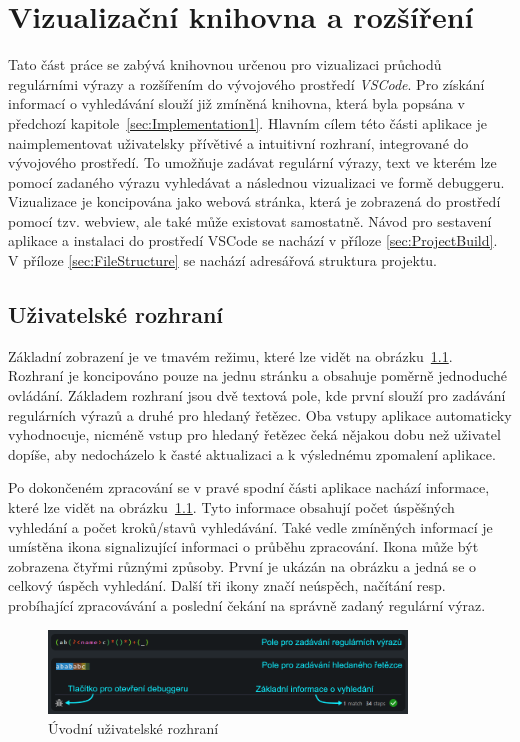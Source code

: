 \chapter{Vizualizační knihovna a rozšíření}\label{sec:Implementation2}

Tato část práce se zabývá knihovnou určenou pro vizualizaci průchodů regulárními výrazy a rozšířením do vývojového prostředí \textit{VSCode}.
Pro získání informací o vyhledávání slouží již zmíněná knihovna, která byla popsána v předchozí kapitole~\ref{sec:Implementation1}.
Hlavním cílem této části aplikace je naimplementovat uživatelsky přívětivé a intuitivní rozhraní, integrované do vývojového prostředí.
To umožňuje zadávat regulární výrazy, text ve kterém lze pomocí zadaného výrazu vyhledávat a následnou vizualizaci ve formě debuggeru.
Vizualizace je koncipována jako webová stránka, která je zobrazená do prostředí pomocí tzv. webview, ale také může existovat samostatně.
Návod pro sestavení aplikace a instalaci do prostředí VSCode se nachází v příloze \ref{sec:ProjectBuild}. 
V příloze \ref{sec:FileStructure} se nachází adresářová struktura projektu.

\section{Uživatelské rozhraní}

Základní zobrazení je ve tmavém režimu, které lze vidět na obrázku~\ref{fig:GeneralUI}.
Rozhraní je koncipováno pouze na jednu stránku a obsahuje poměrně jednoduché ovládání.
Základem rozhraní jsou dvě textová pole, kde první slouží pro zadávání regulárních výrazů a druhé pro hledaný řetězec.
Oba vstupy aplikace automaticky vyhodnocuje, nicméně vstup pro hledaný řetězec čeká nějakou dobu než uživatel dopíše, aby nedocházelo k časté aktualizaci a k výslednému zpomalení aplikace.

Po dokončeném zpracování se v pravé spodní části aplikace nachází informace, které lze vidět na obrázku~\ref{fig:GeneralUI}.
Tyto informace obsahují počet úspěšných vyhledání a počet kroků/stavů vyhledávání.
Také vedle zmíněných informací je umístěna ikona signalizující informaci o průběhu zpracování.
Ikona může být zobrazena čtyřmi různými způsoby.
První je ukázán na obrázku a jedná se o celkový úspěch vyhledání.
Další tři ikony značí neúspěch, načítání resp. probíhající zpracovávání a poslední čekání na správně zadaný regulární výraz.

\begin{figure}[!h]
	\centering
	\includegraphics[width=0.85\textwidth]{Figures/appWindow.png}
	\caption{Úvodní uživatelské rozhraní}
	\label{fig:GeneralUI}
\end{figure}

